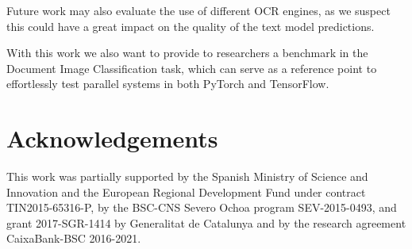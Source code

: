 \documentclass[runningheads]{llncs}
\begin{document}
Future work may also evaluate the use of different OCR engines, as we suspect this could have a great impact on the quality of the text model predictions.

With this work we also want to provide to researchers a benchmark in the Document Image Classification task, which can serve as a reference point to effortlessly test parallel systems in both PyTorch and TensorFlow.



\section{Acknowledgements}
This work was partially supported by the Spanish Ministry of Science and Innovation and the European Regional Development Fund under contract TIN2015-65316-P, by the BSC-CNS Severo Ochoa program
SEV-2015-0493, and grant 2017-SGR-1414 by Generalitat de Catalunya and by the research agreement CaixaBank-BSC 2016-2021.


\normalsize







\end{document}
